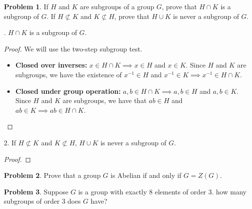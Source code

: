 \documentclass[12pt,reqno]{article}
\theoremstyle{plain}
\theoremstyle{definition}
\newtheorem{problem}{Problem}
\begin{document}
\begin{problem}
    If $H$ and $K$ are subgroups of a group $G$, prove that $H \cap K$ is a subgroup of $G$. If $H \not \subset K$ and $K \not \subset H$, prove that $H \cup K$ is never a subgroup of $G$.
\end{problem}

. \(H\cap K\) is a subgroup of \(G\).

\begin{proof}
    We will use the two-step subgroup test.
    \begin{itemize}
        \item \textbf{Closed over inverses:} \(x\in H\cap K \implies x\in H\) and
        \(x\in K\). Since \(H\) and \(K\) are subgroups, we have the existence of \(x^{-1}\in H\) and 
        \(x^{-1}\in K \implies x^{-1}\in H\cap K\). 

        \item \textbf{Closed under group operation:} \(a,b\in H\cap K\implies a,b\in H\) and \(a,b\in K\).
        Since \(H\) and \(K\) are subgroups, we have that \(ab\in H\) and \(ab\in K\implies ab\in H\cap K\).
    \end{itemize}
\end{proof}

2. If $H \not \subset K$ and $K \not \subset H$, $H \cup K$ is never a subgroup of $G$.
\begin{proof}
    
\end{proof}

\newpage


\begin{problem} 
    Prove that a group $G$ is Abelian if and only if $G = Z(G)$.
\end{problem}

\newpage


\begin{problem} 
    Suppose $G$ is a group with exactly 8 elements of order $3$. how many subgroups of order $3$ does $G$ have?
\end{problem}
\end{document}
